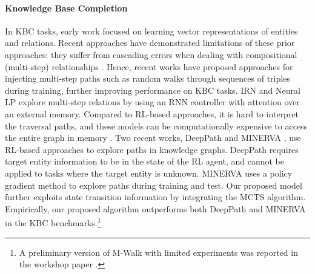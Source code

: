 \documentclass{article}
\begin{document}
	\paragraph{Knowledge Base Completion}
	In KBC tasks, early work \cite{bordes2013translating} focused on learning vector representations of entities and relations. 
	Recent approaches have demonstrated limitations of these prior approaches: they suffer from cascading errors when dealing with compositional (multi-step) relationships \cite{GuuMiLi15}.
	Hence, recent works \cite{gardner2014incorporating, neelakantan2015compositional, GuuMiLi15, PTransE2015EMNLP, KristinaQu16} have proposed approaches for injecting multi-step paths such as random walks through sequences of triples during training, further improving performance on KBC tasks.
	IRN \cite{shen2017modeling} and Neural LP \cite{yang2017differentiable} explore multi-step relations by using an RNN controller with attention over an external memory. 
	Compared to RL-based approaches, it is hard to interpret the traversal paths, and these models can be computationally expensive to access the entire graph in memory \cite{shen2017modeling}.
	Two recent works, DeepPath \cite{DeepPath} and MINERVA \cite{GoforaWalk}, use RL-based approaches to explore paths in knowledge graphs. 
	DeepPath requires target entity information to be in the state of the RL agent, and cannot be applied to tasks where the target entity is unknown.
	MINERVA \cite{GoforaWalk} uses a policy gradient method to explore paths during training and test.
	Our proposed model further exploits state transition information by integrating the MCTS algorithm. 
	Empirically, our proposed algorithm outperforms both DeepPath and MINERVA in the KBC benchmarks.\footnote{A preliminary version of M-Walk with limited experiments was reported in the workshop paper \cite{shen2018reinforcewalk}.}
	
	
	
	
\end{document}
